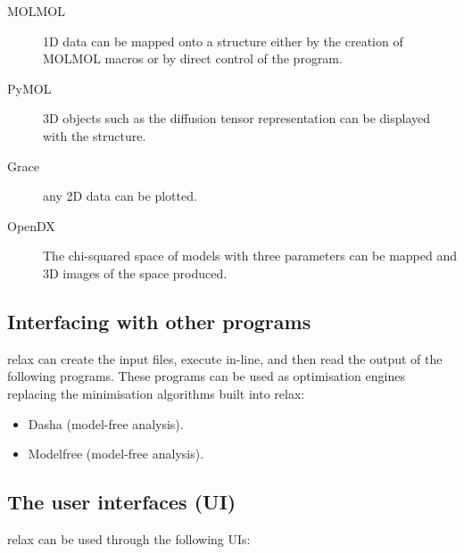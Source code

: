 \begin{description}
\item[MOLMOL] 1D data can be mapped onto a structure either by the creation of MOLMOL macros or by direct control of the program.
\item[PyMOL] 3D objects such as the diffusion tensor representation can be displayed with the structure.
\item[Grace] any 2D data can be plotted.
\item[OpenDX] The chi-squared space of models with three parameters can be mapped and 3D images of the space produced.
\end{description}



\subsection{Interfacing with other programs}

relax can create the input files, execute in-line, and then read the output of the following programs. These programs can be used as optimisation engines replacing the minimisation algorithms built into relax:

\begin{itemize}
\item Dasha (model-free analysis).
\item Modelfree (model-free analysis).
\end{itemize}



\subsection{The user interfaces (UI)}

relax can be used through the following UIs:

